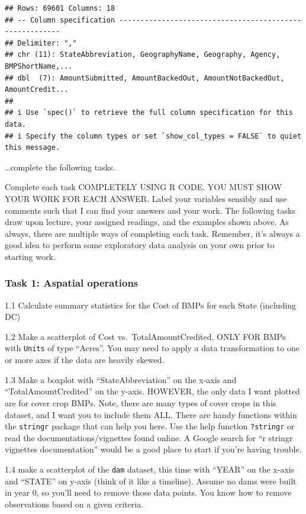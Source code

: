 \documentclass[]{article}
\begin{document}
\begin{verbatim}
## Rows: 69601 Columns: 18
## -- Column specification --------------------------------------------------------
## Delimiter: ","
## chr (11): StateAbbreviation, GeographyName, Geography, Agency, BMPShortName,...
## dbl  (7): AmountSubmitted, AmountBackedOut, AmountNotBackedOut, AmountCredit...
## 
## i Use `spec()` to retrieve the full column specification for this data.
## i Specify the column types or set `show_col_types = FALSE` to quiet this message.
\end{verbatim}

\ldots complete the following tasks.

Complete each task COMPLETELY USING R CODE. YOU MUST SHOW YOUR WORK FOR
EACH ANSWER. Label your variables sensibly and use comments such that I
can find your answers and your work. The following tasks draw upon
lecture, your assigned readings, and the examples shown above. As
always, there are multiple ways of completing each task. Remember, it's
always a good idea to perform some exploratory data analysis on your own
prior to starting work.

\subsubsection{Task 1: Aspatial
operations}\label{task-1-aspatial-operations}

1.1 Calculate summary statistics for the Cost of BMPs for each State
(including DC)

1.2 Make a scatterplot of Cost vs.~TotalAmountCredited, ONLY FOR BMPs
with \texttt{Units} of type ``Acres''. You may need to apply a data
transformation to one or more axes if the data are heavily skewed.

1.3 Make a boxplot with ``StateAbbreviation'' on the x-axis and
``TotalAmountCredited'' on the y-axis. HOWEVER, the only data I want
plotted are for cover crop BMPs. Note, there are many types of cover
crops in this dataset, and I want you to include them ALL. There are
handy functions within the \texttt{stringr} package that can help you
here. Use the help function \texttt{?stringr} or read the
documentations/vignettes found online. A Google search for ``r stringr
vignettes documentation'' would be a good place to start if you're
having trouble.

1.4 make a scatterplot of the \texttt{dam} dataset, this time with
``YEAR'' on the x-axis and ``STATE'' on y-axis (think of it like a
timeline). Assume no dams were built in year 0, so you'll need to remove
those data points. You know how to remove observations based on a given
criteria.
\end{document}
